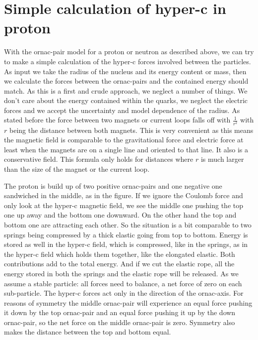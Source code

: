 \section{Simple calculation of hyper-c in proton}

With the ornac-pair model for a proton or neutron as described above, we can try to make a simple calculation of the hyper-c forces involved between the particles. As input we take the radius of the nucleus and its energy content or mass, then we calculate the forces between the ornac-pairs and the contained energy should match. As this is a first and crude approach, we neglect a number of things. We don't care about the energy contained within the quarks, we neglect the electric forces and we accept the uncertainty and model dependence of the radius.
As stated before the force between two magnets or current loops falls off with $  \frac{1}{r^2} $ with $ r $ being the distance between both magnets. This is very convenient as this means the magnetic field is comparable to the gravitational force and electric force at least when the magnets are on a single line and oriented to that line. It also is a conservative field. This formula only holds for distances where $r$ is much larger than the size of the magnet or the current loop.

The proton is build up of two positive ornac-pairs and one negative one sandwiched in the middle, as in the figure. If we ignore the Coulomb force and only look at the hyper-c magnetic field, we see the middle one pushing the top one up away and the bottom one downward. On the other hand the top and bottom one are attracting each other. So the situation is a bit comparable to two springs being compressed by a thick elastic going from top to bottom. Energy is stored as well in the hyper-c field, which is compressed, like in the springs, as in the hyper-c field which holds them together, like the elongated elastic. Both contributions add to the total energy. And if we cut the elastic rope, all the energy stored in both the springs and the elastic rope will be released.
As we assume a stable particle: all forces need to balance, a net force of zero on each sub-particle. The hyper-c forces act only in the direction of the ornac-axis. For reasons of symmetry the middle ornac-pair will experience an equal force pushing it down by the top ornac-pair and an equal force pushing it up by the down ornac-pair, so the net force on the middle ornac-pair is zero. Symmetry also makes the distance between the top and bottom equal.

